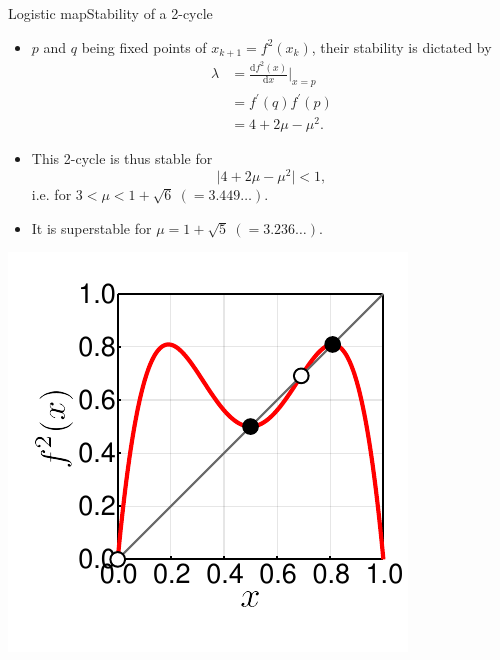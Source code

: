 \documentclass[usenames,dvipsnames,svgnames,10pt,aspectratio=169]{beamer}
\begin{document}
\begin{frame}[t, c]{Logistic map}{Stability of a 2-cycle}
	\begin{minipage}{.68\textwidth}
		\begin{itemize}
			\item \( p \) and \( q \) being fixed points of \( x_{k+1} = f^2(x_k) \), their stability is dictated by
			\[
				\begin{aligned}
					\lambda & = \displaystyle \frac{\mathrm{d}f^2(x)}{\mathrm{d}x} \Big\vert_{x=p} \\
					& = f^{\prime}(q) f^{\prime}(p) \\
					& = 4 + 2 \mu - \mu^2.
				\end{aligned}
			\]

			\item This 2-cycle is thus stable for
			\[
				\vert 4 + 2\mu - \mu^2 \vert < 1,
			\]
			i.e. for \( 3 < \mu < 1 + \sqrt{6} \ (= 3.449\ldots )\).

			\medskip

			\item It is superstable for \( \mu = 1 + \sqrt{5} \ (=3.236\ldots )\).
		\end{itemize}
	\end{minipage}%
	\hfill
	\begin{minipage}{.28\textwidth}
		\centering
		\includegraphics[width=\textwidth]{cycle_2_creation}
	\end{minipage}

	\vspace{1cm}
\end{frame}
\end{document}
